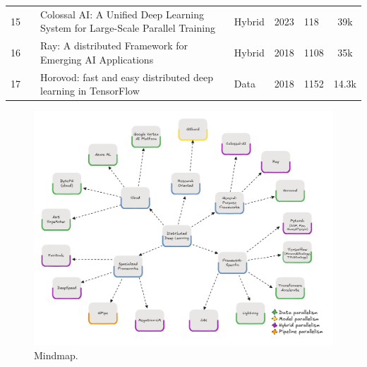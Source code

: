\begin{table}[htbp]
\begin{tabular}{llp{8.4cm}lllc}
		\small 15          & \small \cite{li_colossal-ai_2023}       & \small Colossal AI: A Unified Deep Learning System for Large-Scale Parallel Training                             & \small Hybrid        & \small 2023          & \small 118                & \small 39k \cite{noauthor_hpcaitechcolossalai_2025}                  \\[1ex]
		\small 16          & \small \cite{moritz_ray_2018}           & \small Ray: A distributed Framework for Emerging AI Applications                                                 & \small Hybrid        & \small 2018          & \small 1108               & \small 35k \cite{noauthor_ray-projectray_2025}                       \\[1ex]
		\small 17          & \small \cite{sergeev_horovod_2018}      & \small Horovod: fast and easy distributed deep learning in TensorFlow                                            & \small Data          & \small 2018          & \small 1152               & \small 14.3k \cite{noauthor_horovodhorovod_2025}                     \\[1ex]
		\hline
	\end{tabular}
\end{table}

\begin{figure}[th]
	\centering
	\includegraphics[width=\linewidth]{figures/mindmap}
	\caption{Mindmap.}
	\label{fig:mindmap}
\end{figure}

